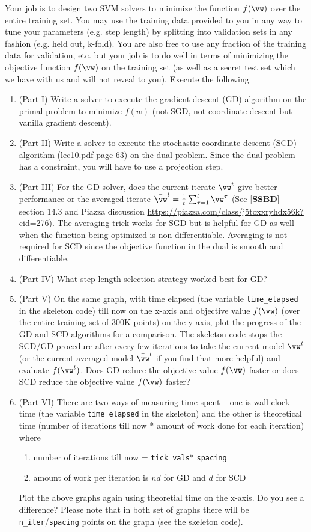 \documentclass[a4paper,11pt]{article}
\begin{document}
\begin{mlproblem}{40}
Your job is to design two SVM solvers to minimize the function $f(\vw)$ over the entire training set. You may use the training data provided to you in any way to tune your parameters (e.g. step length) by splitting into validation sets in any fashion (e.g. held out, k-fold). You are also free to use any fraction of the training data for validation, etc. but your job is to do well in terms of minimizing the objective function $f(\vw)$ on the training set (as well as a secret test set which we have with us and will not reveal to you). Execute the following
\begin{enumerate}
	\item (Part I) Write a solver to execute the gradient descent (GD) algorithm on the primal problem to minimize $f(w)$ (not SGD, not coordinate descent but vanilla gradient descent).
	\item (Part II) Write a solver to execute the stochastic coordinate descent (SCD) algorithm (lec10.pdf page 63) on the dual problem. Since the dual problem has a constraint, you will have to use a projection step.
	\item (Part III) For the GD solver, does the current iterate $\vw^t$ give better performance or the averaged iterate $\bar{\vw}^t = \frac{1}{t}\sum_{\tau=1}^t\vw^\tau$ (See [\textbf{SSBD}] section 14.3 and Piazza discussion \url{https://piazza.com/class/j5toxxryhdx56k?cid=276}). The averaging trick works for SGD but is helpful for GD as well when the function being optimized is non-differentiable. Averaging is not required for SCD since the objective function in the dual is smooth and differentiable.
	\item (Part IV) What step length selection strategy worked best for GD?
	\item (Part V) On the same graph, with time elapsed (the variable \verb|time_elapsed| in the skeleton code) till now on the x-axis and objective value $f(\vw)$ (over the entire training set of 300K points) on the y-axis, plot the progress of the GD and SCD algorithms for a comparison. The skeleton code stops the SCD/GD procedure after every few iterations to take the current model $\vw^t$ (or the current averaged model $\bar{\vw}^t$ if you find that more helpful) and evaluate $f(\vw^t)$. Does GD reduce the objective value $f(\vw)$ faster or does SCD reduce the objective value $f(\vw)$ faster?
	\item (Part VI) There are two ways of measuring time spent -- one is wall-clock time (the variable \verb|time_elapsed| in the skeleton) and the other is theoretical time (number of iterations till now * amount of work done for each iteration) where
	\begin{enumerate}
		\item number of iterations till now = \verb|tick_vals|* \verb|spacing|
		\item amount of work per iteration is $nd$ for GD and $d$ for SCD
	\end{enumerate}
	Plot the above graphs again using theoretial time on the x-axis. Do you see a difference? Please note that in both set of graphs there will be \verb|n_iter|/\verb|spacing| points on the graph (see the skeleton code).
\end{enumerate}


\end{mlproblem}
\end{document}
